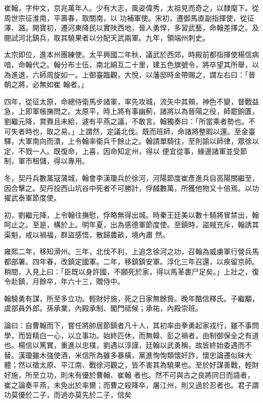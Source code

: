 \begin{pinyinscope}
 崔翰，字仲文，京兆萬年人。少有大志，風姿偉秀，太祖見而奇之，以隸麾下。從周世宗征淮南，平壽春，取關南，以
 功補軍使。宋初，遷御馬直副指揮使，從征澤、潞。開寶初，遷河東降民以實陜西地，晉人勇悍，多習武藝，命翰差擇之。及閱試河北鎮兵，取其驍果者以分配天武兩軍。九年，領端州刺史。



 太宗即位，進本州團練使。太平興國二年秋，議武於西郊，時殿前都指揮使楊信病喑，命翰代之。翰分布士伍，南北綿互二十里，建五色旗號令，將卒望其所舉，以為進退，六師周旋如一。上御臺臨觀，大悅，以藩邸時金帶賜之，謂左右曰：「晉朝之將，必無如崔
 翰者。」



 四年，從征太原，命總侍衛馬步諸軍，率先攻城，流矢中其頰，神色不變，督戰益急，上即軍帳撫問之。太原平，時上將有事幽薊，諸將以為晉陽之役，師罷餉匱，劉繼元降，賞賚且未給，遽有平燕之議，不敢言。翰獨奏曰：「所當乘者勢也。不可失者時也，取之易。」上謂然，定議北伐。既而班師，命諸將整暇以還。至金臺驛，大軍南向而潰，上令翰率衛兵千餘止之。翰請單騎往，至則諭以師律，眾徐以定，不戮一人。既復命，上喜，因命知定州，得以
 便宜從事，緣邊諸軍並受節制，軍市租儲，得以專用。



 冬，契丹兵數萬寇蒲城，翰會李漢瓊兵於徐河，河陽節度崔彥進兵自高陽關繼至，因合擊之。契丹投西山坑谷中死者不可勝計，俘馘數萬，所獲他物又十倍焉。以功擢武泰軍節度使。



 初，劉繼元降，上令翰往撫慰，俘略無得出城。時秦王廷美以數十騎將冒禁出，翰呵止之。至是，構於上。明年夏，出為感德軍節度使。至鎮時，盜賊充斥，翰誘其渠魁，戒以禍福，群盜感悟，散歸農畝，境內肅
 然。



 雍熙二年，移知滑州。三年，北伐不利，上追念徐河之功，召翰為威虜軍行營兵馬都部署。四年春，改鎮定國軍。二年，移鎮鎮安軍。淳化三年召還，以疾留京師。稍間，入見上曰：「臣既以身許國，不願死於家，得以馬革裹尸足矣。」上壯之，復令赴鎮，月餘卒，年六十三，贈侍中。



 翰驍勇有謀，所至多立功。輕財好施，死之日家無餘貲。晚年酷信釋氏。子繼顒，虞部員外郎。孫承業，內殿承制、閣門祗候；承祐，內殿崇班。



 論曰：自曹翰而下，嘗任將帥居節鎮者凡十人，其初率由拳勇起家戎行，雖不事問學，而皆精白一心，以立事功。始終匹休，而無韓、彭之禍者，由制御保全之有道也。楊信以篤實，重進以忠樸，劉遇以淳謹，廷翰以武勇稱，故皆終始委遇而不替。漢瓊雖木強使酒，米信所為雖多暴橫，黨進恂恂類懷奸詐，懷忠論遷似昧大體；然以徵太原、平江南、戰徐河觀之，皆不害其為驍果也。至於好謀善戰，輕財好施，所至立功，則未有優於曹翰、崔翰
 者也。然不可與古之良將同日而語者，崔之論奏平燕，未免出於率爾；而曹之殺降卒，屠江州，則又過於忍者也。君子謂功莫優於二子，而過亦莫先於二子，信矣



\end{pinyinscope}